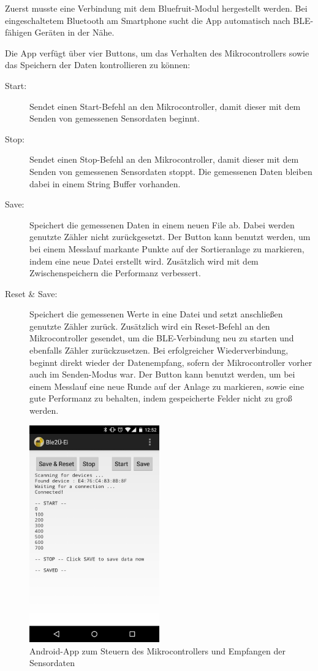 Zuerst musste eine Verbindung mit dem Bluefruit-Modul hergestellt werden. Bei eingeschaltetem Bluetooth am Smartphone sucht die App automatisch nach BLE-fähigen Geräten in der Nähe. 

Die App verfügt über vier Buttons, um das Verhalten des Mikrocontrollers sowie das Speichern der Daten kontrollieren zu können:
\begin{description}
	\item[Start:] Sendet einen Start-Befehl an den Mikrocontroller, damit dieser mit dem Senden von gemessenen Sensordaten beginnt.
	\item[Stop:] Sendet einen Stop-Befehl an den Mikrocontroller, damit dieser mit dem Senden von gemessenen Sensordaten stoppt. Die gemessenen Daten bleiben dabei in einem String Buffer vorhanden.
	\item[Save:] Speichert die gemessenen Daten in einem neuen File ab. Dabei werden genutzte Zähler nicht zurückgesetzt. Der Button kann benutzt werden, um bei einem Messlauf markante Punkte auf der Sortieranlage zu markieren, indem eine neue Datei erstellt wird. Zusätzlich wird mit dem Zwischenspeichern die Performanz verbessert.
	\item[Reset \& Save:] Speichert die gemessenen Werte in eine Datei und setzt anschließen genutzte Zähler zurück. Zusätzlich wird ein Reset-Befehl an den Mikrocontroller gesendet, um die BLE-Verbindung neu zu starten und ebenfalls Zähler zurückzusetzen. Bei erfolgreicher Wiederverbindung, beginnt direkt wieder der Datenempfang, sofern der Mikrocontroller vorher auch im Senden-Modus war. Der Button kann benutzt werden, um bei einem Messlauf eine neue Runde auf der Anlage zu markieren, sowie eine gute Performanz zu behalten, indem gespeicherte Felder nicht zu groß werden.
\end{description}

\begin{figure}[h]
	\centering
	\includegraphics[width=0.5\textwidth]{images/k3-androidapp.png}
	\caption {Android-App zum Steuern des Mikrocontrollers und Empfangen der Sensordaten}
	\label{fig:k3_androidapp}
\end{figure}

